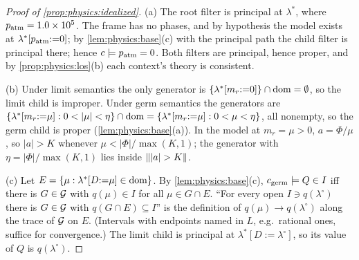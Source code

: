 \begin{proof}[Proof of \cref{prop:physics:idealized}]
(a) The root filter is principal at $\lambda^*$, where $p_{\rm atm}=1.0\times10^5$. The
frame has no phases, and by hypothesis the model exists at
$\lambda^*[p_{\rm atm}{:=}0]$; by \cref{lem:physics:base}(c) with the principal path
the child filter is principal there; hence $c\models p_{\rm atm}=0$. Both filters are
principal, hence proper, and by \cref{prop:physics:los}(b) each context's theory is
consistent.

(b) Under limit semantics the only generator is $\{\lambda^*[m_r{:=}0]\}\cap\operatorname{dom}=\emptyset$,
so the limit child is improper. Under germ semantics the generators are
$\{\lambda^*[m_r{:=}\mu]:0<|\mu|<\eta\}\cap\dom=\{\lambda^*[m_r{:=}\mu]:0<\mu<\eta\}$, all
nonempty, so the germ child is proper (\cref{lem:physics:base}(a)). In the model at
$m_r=\mu>0$, $a=\Phi/\mu$, so $|a|>K$ whenever $\mu<|\Phi|/\max(K,1)$; the generator with
$\eta=|\Phi|/\max(K,1)$ lies inside $\tset{|a|>K}$.

(c) Let $E=\{\mu:\lambda^*[D{:=}\mu]\in\operatorname{dom}\}$. By \cref{lem:physics:base}(c),
$c_{\rm germ}\models Q\in I$ iff there is $G\in\mathcal{G}$ with $q(\mu)\in I$ for all $\mu\in G\cap E$.
``For every open $I\ni q(\lambda^\circ)$ there is $G\in\mathcal{G}$ with $q(G\cap E)\subseteq I$'' is
the definition of $q(\mu)\to q(\lambda^\circ)$ along the trace of $\mathcal{G}$ on $E$. (Intervals
with endpoints named in $L$, e.g.\ rational ones, suffice for convergence.) The limit
child is principal at $\lambda^*[D{:=}\lambda^\circ]$, so its value of $Q$ is
$q(\lambda^\circ)$.
\end{proof}

